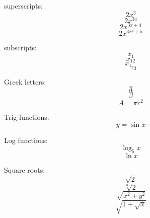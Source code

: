 \documentclass[12pt]{article}
\begin{document}
superscripts: $$2x^3$$
$$2x^{34}$$
$$2x^{3x+4}$$
$$2x^{3x^4+5}$$

subscripts: $$x_1$$
$$x_{12}$$
$${x_{1_2}}_3$$

Greek letters:
$$\pi$$
$$\alpha$$
$$\beta$$
$$A=\pi r^2$$

Trig functions:
$$y=\sin{x}$$

Log functions:
$$\log_5{x}$$
$$\ln{x}$$

Square roots:
$$\sqrt{2}$$
$$\sqrt[3]{2}$$
$$\sqrt{x^2+y^2}$$
$$\sqrt{1+\sqrt{x}}$$
\end{document}
